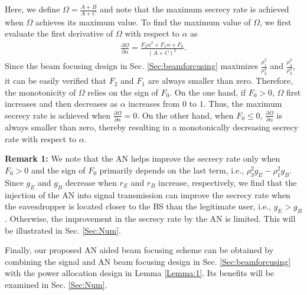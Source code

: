 \documentclass[10pt,technote]{IEEEtran}
\newcommand{\1}{\mathbbm{1}}
\begin{document}
\begin{IEEEproof}
Here, we define $\Omega=\frac{A+B}{A+C}$ and note that the maximum secrecy rate is achieved when $\Omega$ achieves its maximum value. To find the maximum value of $\Omega$, we first evaluate the first derivative of $\Omega$ with respect to $\alpha$ as
\begin{align}\label{eq:firstOrder}
\frac{\partial\Omega }{\partial \alpha} = \frac{F_2\alpha^2+F_1\alpha+F_0}{(A+C)^2}.     
\end{align}
Since the beam focusing design in Sec. \ref{Sec:beamforcusing} maximizes $\frac{\rho_1^2}{\rho_2^2}$ and $\frac{\rho_4^2}{\rho_3^2}$, it can be easily verified that $F_2$ and $F_1$ are always smaller than zero. Therefore, the monotonicity of $\Omega$ relies on the sign of $F_0$. On the one hand, if $F_0>0$, $\Omega$ first increases and then decreases as $\alpha$ increases from $0$ to $1$. Thus, the maximum secrecy rate is achieved when $\frac{\partial\Omega }{\partial \alpha}=0$. On the other hand, when $F_0\leq 0$, $\frac{\partial\Omega }{\partial \alpha}$ is always smaller than zero, thereby resulting in a monotonically decreasing secrecy rate with respect to $\alpha$.
\end{IEEEproof}

\textbf{Remark 1:} We note that the AN helps improve the secrecy rate only when $F_0>0$ and the sign of $F_0$ primarily depends on the last term, i.e., $\rho_3^2g_E-\rho_1^2g_B$. Since $g_E$ and $g_B$ decrease when $r_E$ and $r_B$ increase, respectively, we find that the injection of the AN into signal transmission can improve the secrecy rate when the eavesdropper is located closer to the BS than the legitimate user, i.e., $g_E>g_B$. Otherwise, the improvement in the secrecy rate by the AN is limited. This will be illustrated in Sec. \ref{Sec:Num}.

Finally, our proposed AN aided beam focusing scheme can be obtained by combining the signal and AN beam focusing design in Sec. \ref{Sec:beamforcusing} with the power allocation design in Lemma \ref{Lemma:1}. %
Its benefits will be examined in Sec. \ref{Sec:Num}.
\end{document}
